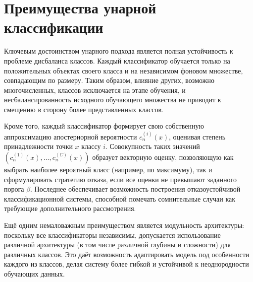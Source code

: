 \section{Преимущества унарной классификации}

Ключевым достоинством унарного подхода является полная устойчивость к проблеме дисбаланса классов. Каждый классификатор обучается только на положительных объектах своего класса и на независимом фоновом множестве, совпадающим по размеру. Таким образом, влияние других, возможно многочисленных, классов исключается на этапе обучения, и несбалансированность исходного обучающего множества не приводит к смещению в сторону более представленных классов.

Кроме того, каждый классификатор формирует свою собственную аппроксимацию апостериорной вероятности \(c_n^{(i)}(x)\), оценивая степень принадлежности точки \(x\) классу \(i\). Совокупность таких значений \((c_n^{(1)}(x), \dots, c_n^{(C)}(x))\) образует векторную оценку, позволяющую как выбрать наиболее вероятный класс (например, по максимуму), так и сформулировать стратегию отказа, если все оценки не превышают заданного порога \(\beta\). Последнее обеспечивает возможность построения отказоустойчивой классификационной системы, способной помечать сомнительные случаи как требующие дополнительного рассмотрения.

Ещё одним немаловажным преимуществом является модульность архитектуры: поскольку все классификаторы независимы, допускается использование различной архитектуры (в том числе различной глубины и сложности) для различных классов. Это даёт возможность адаптировать модель под особенности каждого из классов, делая систему более гибкой и устойчивой к неоднородности обучающих данных.
